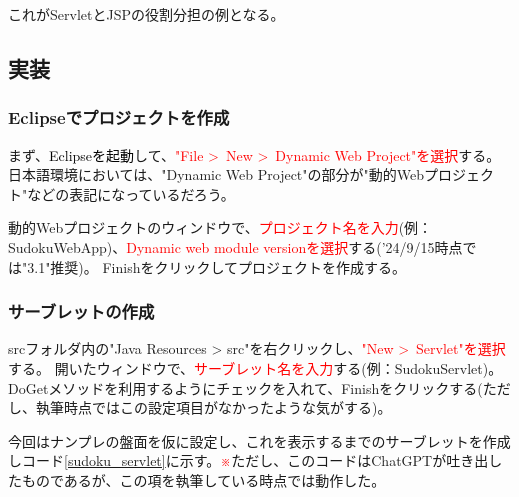 \documentclass[a4paper,10pt]{jsarticle}
\begin{document}
    これがServletとJSPの役割分担の例となる。

  \subsection{実装}
    \subsubsection{Eclipseでプロジェクトを作成}
      まず、\textcolor{black}{Eclipseを起動}して、\textcolor{red}{"File \textgreater \ New \textgreater \ Dynamic Web Project"を選択}する。
      日本語環境においては、"Dynamic Web Project"の部分が"動的Webプロジェクト"などの表記になっているだろう。

      動的Webプロジェクトのウィンドウで、\textcolor{red}{プロジェクト名を入力}(例：SudokuWebApp)、\textcolor{red}{Dynamic web module versionを選択}する('24/9/15時点では"3.1"推奨)。
      Finishをクリックしてプロジェクトを作成する。
    \subsubsection{サーブレットの作成}
      srcフォルダ内の"Java Resources > src"を右クリックし、\textcolor{red}{"New \textgreater \ Servlet"を選択}する。
      開いたウィンドウで、\textcolor{red}{サーブレット名を入力}する(例：SudokuServlet)。
      DoGetメソッドを利用するようにチェックを入れて、Finishをクリックする(ただし、執筆時点ではこの設定項目がなかったような気がする)。

      今回はナンプレの盤面を仮に設定し、これを表示するまでのサーブレットを作成しコード\ref{sudoku_servlet}に示す。\textcolor{red}{※}ただし、このコードはChatGPTが吐き出したものであるが、この項を執筆している時点では動作した。\\
\end{document}
